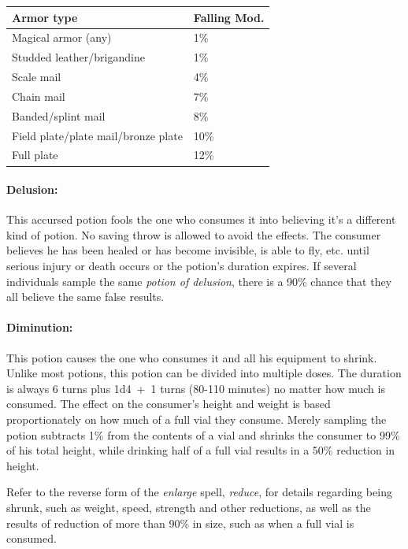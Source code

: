 \begin{multicols}{2}
\noindent
\begin{tabular}{|p{}|p{}|}
\hline
Armor type	& Falling Mod.\\
\hline\hline
\rowcolor[gray]{.9}Magical armor (any)	& 1\%\\
Studded leather/brigandine	& 1\%\\
\rowcolor[gray]{.9}Scale mail	& 4\%\\
Chain mail	& 7\%\\
\rowcolor[gray]{.9}Banded/splint mail	& 8\%\\
Field plate/plate mail/bronze plate	& 10\%\\
\rowcolor[gray]{.9}Full plate	& 12\%\\
\hline
\end{tabular}

\paragraph{Delusion:} This accursed potion fools the one who consumes it into believing it's a different kind of potion.  No saving throw is allowed to avoid the effects.  The consumer believes he has been healed or has become invisible, is able to fly, etc. until serious injury or death occurs or the potion's duration expires.  If several individuals sample the same \textit{potion of delusion}, there is a 90\% chance that they all believe the same false results.

\paragraph{Diminution:} This potion causes the one who consumes it and all his equipment to shrink.  Unlike most potions, this potion can be divided into multiple doses.  The duration is always 6 turns plus 1d4~+~1 turns (80-110 minutes) no matter how much is consumed.  The effect on the consumer's height and weight is based proportionately on how much of a full vial they consume.  Merely sampling the potion subtracts 1\% from the contents of a vial and shrinks the consumer to 99\% of his total height, while drinking half of a full vial results in a 50\% reduction in height.  

Refer to the reverse form of the \textit{enlarge} spell, \textit{reduce}, for details regarding being shrunk, such as weight, speed, strength and other reductions, as well as the results of reduction of more than 90\% in size, such as when a full vial is consumed.


\end{multicols}
